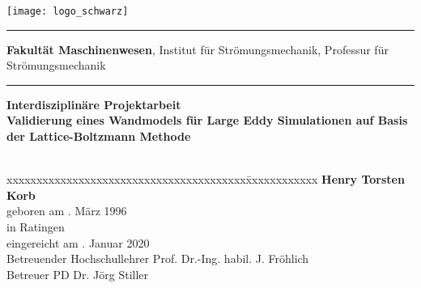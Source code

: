 \begin{titlepage}
\addtolength{\topmargin}{-1.5cm}
\hspace{-2.1cm} \texttt{[image: logo\_schwarz]}
\vspace{0.5cm}
\hrule 
\vspace{0.05cm}
\small\textbf{Fakult\"at Maschinenwesen},
Institut f\"ur Str\"omungsmechanik,
Professur f\"ur Str\"omungsmechanik
\vspace{0.1cm}
\hrule 
\vspace{4cm}
\textbf{\Large Interdisziplinäre Projektarbeit}\\


%
\vspace{1.5cm}
%
\textbf{\LARGE Validierung eines Wandmodels für Large Eddy Simulationen auf Basis der Lattice-Boltzmann Methode}\\[1.5cm]
%
\\[2.6cm]
\normalsize
\begin{tabbing}
xxxxxxxxxxxxxxxxxxxxxxxxxxxxxxxxxxxxxxxx\=xxxxxxxxxxxx\kill
        														\>	\textbf{Henry Torsten Korb}													\\
geboren am													\>	02. März 1996															\\
in																	\>	Ratingen																			\\[0.2cm]
eingereicht am											. Januar 2020																\\[0.5cm]
Betreuender Hochschullehrer					\>  Prof. Dr.-Ing. habil. J. Fr\"ohlich							\\
Betreuer														\>	PD Dr. Jörg Stiller														\\
													 	\\
\end{tabbing}
\cleardoublepage
\end{titlepage}